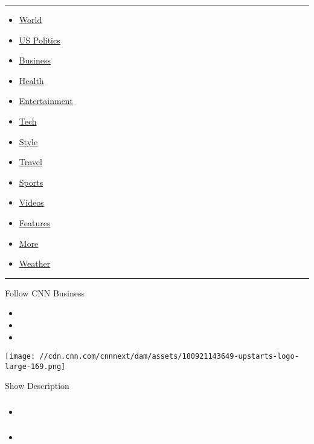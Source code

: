 \begin{center}\rule{0.5\linewidth}{\linethickness}\end{center}

\begin{itemize}
\tightlist
\item
  \href{/world}{World}
\item
  \href{/politics}{US Politics}
\item
  \href{/business}{Business}
\item
  \href{/health}{Health}
\item
  \href{/entertainment}{Entertainment}
\item
  \href{/business/tech}{Tech}
\item
  \href{/style}{Style}
\item
  \href{/travel}{Travel}
\item
  \href{/sport}{Sports}
\item
  \href{/videos}{Videos}
\item
  \href{/specials}{Features}
\item
  \href{/more}{More}
\item
  \href{/weather}{Weather}
\end{itemize}

\begin{center}\rule{0.5\linewidth}{\linethickness}\end{center}

Follow CNN Business

\begin{itemize}
\item
\item
\item
\end{itemize}

\texttt{[image: //cdn.cnn.com/cnnnext/dam/assets/180921143649-upstarts-logo-large-169.png]}

Show Description

\begin{itemize}
\item
  \hypertarget{section}{%
  \subsubsection{\texorpdfstring{\href{/style/gallery/seoul-lgbtq/index.html}{}}{}}\label{section}}
\item
\end{itemize}

